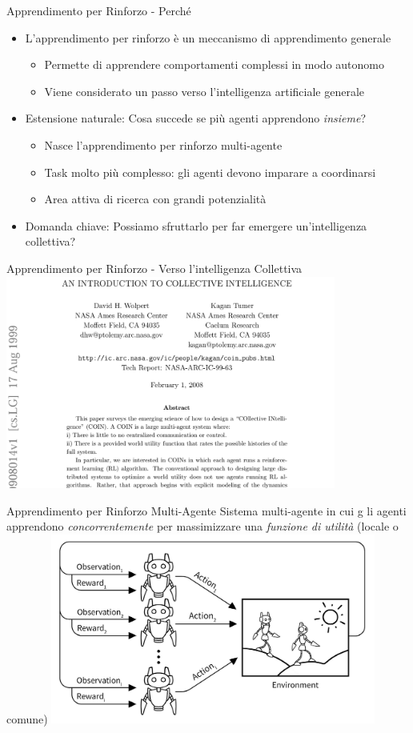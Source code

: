 \documentclass[presentation, 10pt,aspectratio=169]{beamer}\mode<presentation>{\usetheme{AMSBolognaFC}}
\begin{document}
\begin{frame}{Apprendimento per Rinforzo - Perché}
	\begin{itemize}
		\item L'apprendimento per rinforzo è un meccanismo di apprendimento \alert{generale}
		\begin{itemize}
			\item Permette di apprendere comportamenti complessi in modo autonomo
			\item Viene considerato un passo verso l'intelligenza artificiale generale
		\end{itemize}
		\item \alert{Estensione naturale}: Cosa succede se più agenti apprendono \emph{insieme}?
		\begin{itemize}
			\item Nasce l'apprendimento per rinforzo \alert{multi-agente}
			\item Task molto più complesso: gli agenti devono imparare a coordinarsi
			\item Area attiva di ricerca con grandi potenzialità
		\end{itemize}
		\item \alert{Domanda chiave}: Possiamo sfruttarlo per far emergere un'intelligenza collettiva?
	\end{itemize}
\end{frame}
\begin{frame}{Apprendimento per Rinforzo - Verso l'intelligenza Collettiva}
	\centering
	\href{https://arxiv.org/abs/cs/9908014}{\includegraphics[height=7cm]{img/COIN.png}}
\end{frame}
\begin{frame}{Apprendimento per Rinforzo Multi-Agente}
	Sistema multi-agente in cui g	li agenti apprendono \emph{concorrentemente} per massimizzare una \emph{funzione di utilità} (locale o comune)
	\centering
	\includegraphics[width=0.8\textwidth]{img/marl.png}
\end{frame}
\end{document}
